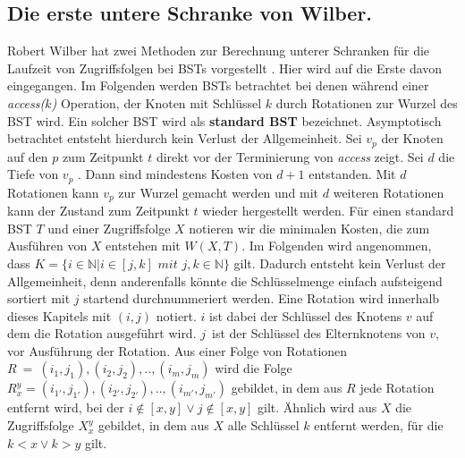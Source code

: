 \documentclass[a4paper,12pt]{article}
\begin{document}
\subsection{Die erste untere Schranke von Wilber.} \label{wilberBound}
Robert Wilber hat zwei Methoden zur Berechnung unterer Schranken für die Laufzeit von Zugriffsfolgen bei BSTs vorgestellt \cite{wilberLowerBounds}. Hier wird auf die Erste davon eingegangen. Im Folgenden werden BSTs betrachtet bei denen während einer \textit{access($k$)} Operation, der Knoten mit Schlüssel $k$ durch Rotationen zur Wurzel des BST wird. Ein solcher BST wird als \textbf{standard BST} bezeichnet. Asymptotisch betrachtet entsteht hierdurch kein Verlust der Allgemeinheit. Sei $v_p$ der Knoten auf den $p$ zum Zeitpunkt $t$ direkt vor der Terminierung von \textit{access} zeigt. Sei $d$ die Tiefe von $v_p$ . Dann sind mindestens Kosten von $d + 1$ entstanden. Mit $d$ Rotationen kann $v_p$ zur Wurzel gemacht werden und mit $d$ weiteren Rotationen kann der Zustand zum Zeitpunkt $t$ wieder hergestellt werden.
Für einen standard BST $T$ und einer Zugriffsfolge $X$ notieren wir die minimalen Kosten, die zum Ausführen von $X$ entstehen mit $W(X, T)$. Im Folgenden wird angenommen, dass 
$K = \{  i \in \mathbb{N} \vert i \in \left[j,k\right] \textit{ mit } j,k \in  \mathbb{N} \} $ gilt. Dadurch entsteht kein Verlust der Allgemeinheit, denn anderenfalls könnte die Schlüsselmenge einfach aufsteigend sortiert mit $j$ startend durchnummeriert werden. Eine Rotation wird innerhalb dieses Kapitels mit $\left(i, j\right)$ notiert. $i$ ist dabei der Schlüssel des Knotens $v$ auf dem die Rotation ausgeführt wird. $j$~ist der Schlüssel des Elternknotens von $v$, vor Ausführung der Rotation. Aus einer Folge von Rotationen $R~=~\left(i_1,j_1 \right),\left(i_2,j_2 \right),..,\left(i_m,j_m \right)$ wird die Folge  $R^y_x = \left(i_{1'},j_{1'}\right),\left(i_{2'},j_{2'} \right),..,\left(i_{m'},j_{m'} \right)$ gebildet, in dem aus $R$ jede Rotation entfernt wird, bei der $i\notin \left[x,y\right] \lor j\notin \left[x,y\right]$ gilt. Ähnlich wird aus $X$ die Zugriffsfolge $X^y_x$ gebildet, in dem aus $X$ alle Schlüssel $k$ entfernt werden, für die $k < x  \lor k > y$ gilt.
\end{document}
